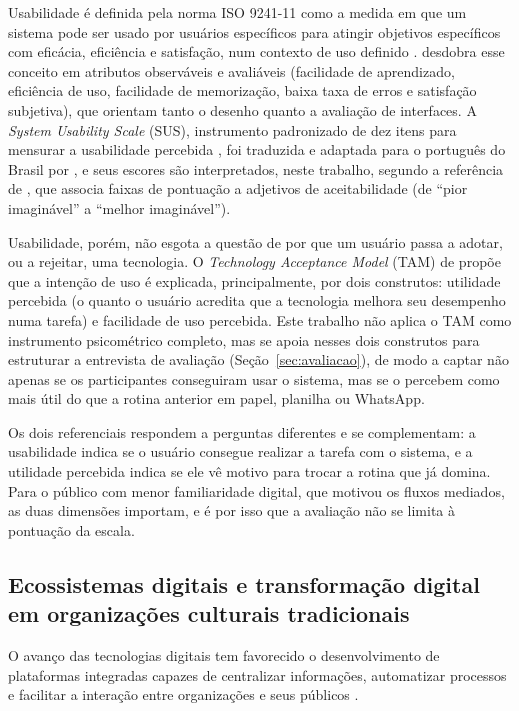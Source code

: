 \documentclass[12pt,a4paper]{article}
\begin{document}
Usabilidade é definida pela norma ISO 9241-11 como a medida em que um sistema pode ser usado por
usuários específicos para atingir objetivos específicos com eficácia, eficiência e satisfação, num
contexto de uso definido \parencite{iso9241_2018}. \textcite{nielsen1993} desdobra esse conceito em
atributos observáveis e avaliáveis (facilidade de aprendizado, eficiência de uso, facilidade de
memorização, baixa taxa de erros e satisfação subjetiva), que orientam tanto o desenho quanto a
avaliação de interfaces. A \textit{System Usability Scale} (SUS), instrumento padronizado de dez
itens para mensurar a usabilidade percebida \parencite{brooke1996}, foi traduzida e adaptada para o
português do Brasil por \textcite{lourenco2022}, e seus escores são interpretados, neste trabalho,
segundo a referência de \textcite{bangor2009}, que associa faixas de pontuação a adjetivos de
aceitabilidade (de ``pior imaginável'' a ``melhor imaginável'').

Usabilidade, porém, não esgota a questão de por que um usuário passa a adotar, ou a rejeitar, uma
tecnologia. O \textit{Technology Acceptance Model} (TAM) de \textcite{davis1989} propõe que a
intenção de uso é explicada, principalmente, por dois construtos: utilidade percebida (o quanto o
usuário acredita que a tecnologia melhora seu desempenho numa tarefa) e facilidade de uso percebida.
Este trabalho não aplica o TAM como instrumento psicométrico completo, mas se apoia nesses dois
construtos para estruturar a entrevista de avaliação (Seção~\ref{sec:avaliacao}), de modo a captar
não apenas se os participantes conseguiram usar o sistema, mas se o percebem como mais útil do que a
rotina anterior em papel, planilha ou WhatsApp.

Os dois referenciais respondem a perguntas diferentes e se complementam: a usabilidade indica se o
usuário consegue realizar a tarefa com o sistema, e a utilidade percebida indica se ele vê motivo para
trocar a rotina que já domina. Para o público com menor familiaridade digital, que motivou os fluxos
mediados, as duas dimensões importam, e é por isso que a avaliação não se limita à pontuação da escala.

\subsection{Ecossistemas digitais e transformação digital em organizações culturais tradicionais}
\label{sec:ecossistemas}

O avanço das tecnologias digitais tem favorecido o desenvolvimento de plataformas integradas capazes
de centralizar informações, automatizar processos e facilitar a interação entre organizações e seus
públicos \parencite{gawercusumano2014,jacobides2018}.
\end{document}
